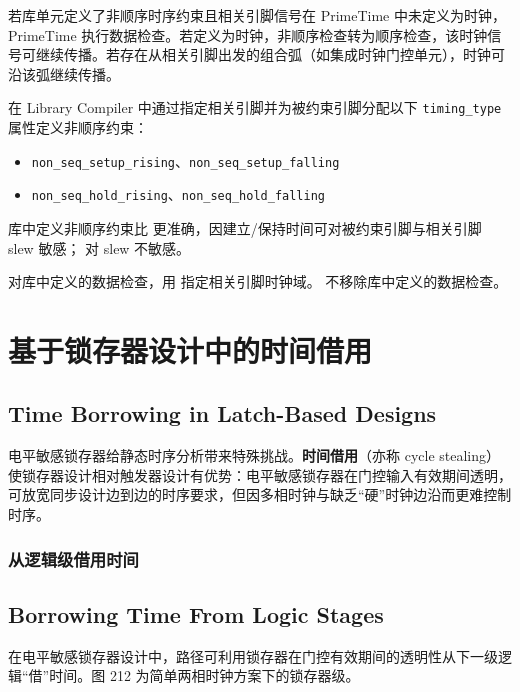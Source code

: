 若库单元定义了非顺序时序约束且相关引脚信号在 PrimeTime 中未定义为时钟，PrimeTime 执行数据检查。若定义为时钟，非顺序检查转为顺序检查，该时钟信号可继续传播。若存在从相关引脚出发的组合弧（如集成时钟门控单元），时钟可沿该弧继续传播。

在 Library Compiler 中通过指定相关引脚并为被约束引脚分配以下 \texttt{timing\_type} 属性定义非顺序约束：
\begin{itemize}
  \item \texttt{non\_seq\_setup\_rising}、\texttt{non\_seq\_setup\_falling}
  \item \texttt{non\_seq\_hold\_rising}、\texttt{non\_seq\_hold\_falling}
\end{itemize}

库中定义非顺序约束比  更准确，因建立/保持时间可对被约束引脚与相关引脚 slew 敏感； 对 slew 不敏感。

对库中定义的数据检查，用  指定相关引脚时钟域。 不移除库中定义的数据检查。

\section{基于锁存器设计中的时间借用}
\subsection*{Time Borrowing in Latch-Based Designs}

电平敏感锁存器给静态时序分析带来特殊挑战。\textbf{时间借用}（亦称 cycle stealing）使锁存器设计相对触发器设计有优势：电平敏感锁存器在门控输入有效期间透明，可放宽同步设计边到边的时序要求，但因多相时钟与缺乏“硬”时钟边沿而更难控制时序。

\subsubsection{从逻辑级借用时间}
\subsection*{Borrowing Time From Logic Stages}

在电平敏感锁存器设计中，路径可利用锁存器在门控有效期间的透明性从下一级逻辑“借”时间。图 212 为简单两相时钟方案下的锁存器级。


